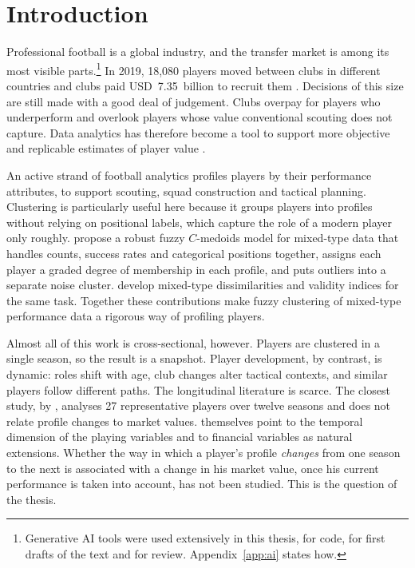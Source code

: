 \chapter{Introduction}
\label{ch:introduction}

Professional football is a global industry, and the transfer market is among its most visible parts.\footnote{Generative AI tools were used extensively in this thesis, for code, for first drafts of the text and for review. Appendix~\ref{app:ai} states how.} In 2019, 18,080 players moved between clubs in different countries and clubs paid USD~7.35~billion to recruit them \cite{franceschi2024determinants}. Decisions of this size are still made with a good deal of judgement. Clubs overpay for players who underperform and overlook players whose value conventional scouting does not capture. Data analytics has therefore become a tool to support more objective and replicable estimates of player value \cite{muller2017beyond}.

An active strand of football analytics profiles players by their performance attributes, to support scouting, squad construction and tactical planning. Clustering is particularly useful here because it groups players into profiles without relying on positional labels, which capture the role of a modern player only roughly.  propose a robust fuzzy $C$-medoids model for mixed-type data that handles counts, success rates and categorical positions together, assigns each player a graded degree of membership in each profile, and puts outliers into a separate noise cluster.  develop mixed-type dissimilarities and validity indices for the same task. Together these contributions make fuzzy clustering of mixed-type performance data a rigorous way of profiling players.

Almost all of this work is cross-sectional, however. Players are clustered in a single season, so the result is a snapshot. Player development, by contrast, is dynamic: roles shift with age, club changes alter tactical contexts, and similar players follow different paths. The longitudinal literature is scarce. The closest study, by , analyses 27 representative players over twelve seasons and does not relate profile changes to market values.  themselves point to the temporal dimension of the playing variables and to financial variables as natural extensions. Whether the way in which a player's profile \emph{changes} from one season to the next is associated with a change in his market value, once his current performance is taken into account, has not been studied. This is the question of the thesis.


